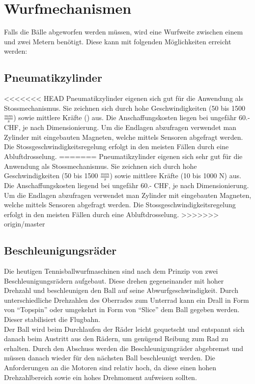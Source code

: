 ﻿\section{Wurfmechanismen}
Falls die Bälle abgeworfen werden müssen, wird eine Wurfweite zwischen einem und zwei Metern benötigt. Diese kann mit folgenden Möglichkeiten erreicht werden:

\subsection{Pneumatikzylinder}
<<<<<<< HEAD
Pneumatikzylinder eigenen sich gut für die Anwendung als Stossmechanismus. Sie zeichnen sich durch hohe Geschwindigkeiten (50 bis 1500 $\frac{mm}{s}$) sowie mittlere Kräfte () aus. Die Anschaffungskosten liegen bei ungefähr 60.- CHF, je nach Dimensionierung. Um die Endlagen abzufragen verwendet man Zylinder mit eingebauten Magneten, welche mittels Sensoren abgefragt werden. Die Stossgeschwindigkeitsregelung erfolgt in den meisten Fällen durch eine Abluftdrosselung.
=======
Pneumatikzylinder eigenen sich sehr gut für die Anwendung als Stossmechanismus. Sie zeichnen sich durch hohe Geschwindigkeiten (50 bis 1500 $\frac{mm}{s}$) sowie mittlere Kräfte (10 bis 1000 N) aus. Die Anschaffungskosten liegend bei ungefähr 60.- CHF, je nach Dimensionierung. Um die Endlagen abzufragen verwendet man Zylinder mit eingebauten Magneten, welche mittels Sensoren abgefragt werden. Die Stossgeschwindigkeitsregelung erfolgt in den meisten Fällen durch eine Abluftdrosselung.
>>>>>>> origin/master

\subsection{Beschleunigungsräder}
Die heutigen Tennisballwurfmaschinen sind nach dem Prinzip von zwei Beschleunigungsrädern aufgebaut. Diese drehen gegeneinander mit hoher Drehzahl und beschleunigen den Ball auf seine Abwurfgeschwindigkeit. Durch unterschiedliche Drehzahlen des Oberrades zum Unterrad kann ein Drall in Form von \enquote{Topspin} oder umgekehrt in Form von \enquote{Slice} dem Ball gegeben werden. Dieser stabilisiert die Flugbahn.\\
Der Ball wird beim Durchlaufen der Räder leicht gequetscht und entspannt sich danach beim Austritt aus den Rädern, um genügend Reibung zum Rad zu erhalten. Durch den Abschuss werden die Beschleunigungräder abgebremst und müssen danach wieder für den nächsten Ball beschleunigt werden. Die Anforderungen an die Motoren sind relativ hoch, da diese einen hohen Drehzahlbereich sowie ein hohes Drehmoment aufweisen sollten.

